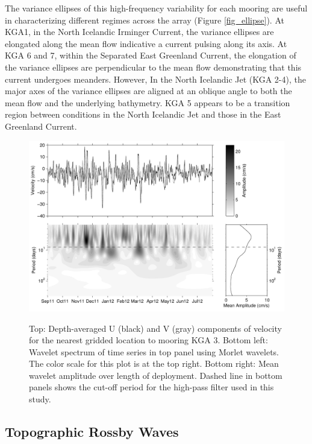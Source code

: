 \documentclass[12pt,titlepage,figuresatend]{article}
\begin{document}
The variance ellipses of this high-frequency variability for each mooring are useful in characterizing different regimes across the array (Figure \ref{fig_ellipse}). At KGA1, in the North Icelandic Irminger Current, the variance ellipses are elongated along the mean flow indicative a current pulsing along its axis. At KGA 6 and 7, within the Separated East Greenland Current, the elongation of the variance ellipses are perpendicular to the mean flow demonstrating that this current undergoes meanders. However, In the North Icelandic Jet (KGA 2-4), the major axes of the variance ellipses are aligned at an oblique angle to both the mean flow and the underlying bathymetry. KGA 5 appears to be a transition region between conditions in the North Icelandic Jet and those in the East Greenland Current.

\begin{figure}[ht!]
  \centering\includegraphics[width=\hsize]{./figures/TRWwavelet.pdf}
  \caption{Top: Depth-averaged U (black) and V (gray) components of velocity for the nearest gridded location to mooring KGA 3. Bottom left: Wavelet spectrum of time series in top panel using Morlet wavelets. The color scale for this plot is at the top right. Bottom right: Mean wavelet amplitude over length of deployment. Dashed line in bottom panels shows the cut-off period for the high-pass filter used in this study.}{\label{fig_waveSpec}}
\end{figure}


\subsection{Topographic Rossby Waves}
\label{TRWsec}
\end{document}
